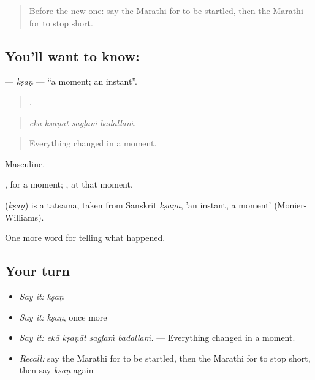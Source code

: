 \label{lesson:MR-C302-ksan}



\begin{quote}
Before the new one: say the Marathi for to be startled, then the Marathi for to stop short.
\end{quote}

\subsection*{You'll want to know: }
\textbf{} — \emph{kṣaṇ} — \textquotedblleft{}a moment; an instant\textquotedblright{}.

\begin{quote}
   .
\end{quote}

\begin{quote}
\emph{ekā kṣaṇāt sagḷaṁ badallaṁ.}
\end{quote}

\begin{quote}
Everything changed in a moment.
\end{quote}

Masculine.

, for a moment;  , at that moment.

\begin{cousinweb}
\textbf{} (\emph{kṣaṇ}) is a tatsama, taken from Sanskrit \emph{kṣaṇa}, 'an instant, a moment' (Monier-Williams).
\end{cousinweb}

\begin{grammarlens}[title={What you've built}]
One more word for telling what happened.
\end{grammarlens}

\subsection*{Your turn}
\begin{itemize}
\raggedright
  \item \emph{Say it:} \emph{kṣaṇ}
  \item \emph{Say it:} \emph{kṣaṇ}, once more
  \item \emph{Say it:} \emph{ekā kṣaṇāt sagḷaṁ badallaṁ.} — Everything changed in a moment.
  \item \emph{Recall:} say the Marathi for to be startled, then the Marathi for to stop short, then say \emph{kṣaṇ} again
\end{itemize}

